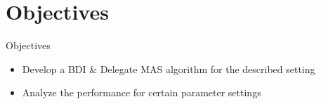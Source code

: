 \section{Objectives}


\begin{frame}{Objectives}
    \begin{itemize}
        \item Develop a BDI \& Delegate MAS algorithm for the described setting
        \item Analyze the performance for certain parameter settings
    \end{itemize}
\end{frame}
